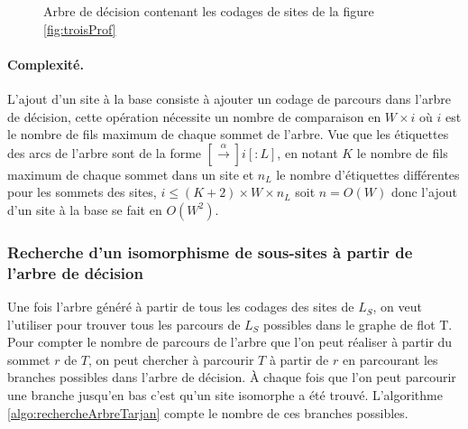 \begin{figure}[h]
\begin{center}
\end{center}
\caption{Arbre de décision contenant les codages de sites de la figure \ref{fig:troisProf}}
\label{fig:arbreDecTarjan}
\end{figure}

\paragraph{Complexité.}
L'ajout d'un site à la base consiste à ajouter un codage de parcours dans l'arbre de décision, cette opération nécessite un nombre de comparaison en $W\times i$ où $i$ est le nombre de fils maximum de chaque sommet de l'arbre. Vue que les étiquettes des arcs de l'arbre sont de la forme $[\xrightarrow{\alpha}]i[:L]$, en notant $K$ le nombre de fils maximum de chaque sommet dans un site et $n_L$ le nombre d'étiquettes différentes pour les sommets des sites, $i\leq (K+2)\times W\times n_L$ soit $n=O(W)$ donc l'ajout d'un site à la base se fait en $O(W^2)$.

\subsubsection{Recherche d'un isomorphisme de sous-sites à partir de l'arbre de décision}
Une fois l'arbre généré à partir de tous les codages des sites de $L_S$, on veut l'utiliser pour trouver tous les parcours de $L_S$ possibles dans le graphe de flot T. Pour compter le nombre de parcours de l'arbre que l'on peut réaliser à partir du sommet $r$ de $T$, on peut chercher à parcourir $T$ à partir de $r$ en parcourant les branches possibles dans l'arbre de décision. À chaque fois que l'on peut parcourir une branche jusqu'en bas c'est qu'un site isomorphe a été trouvé. L'algorithme \ref{algo:rechercheArbreTarjan} compte le nombre de ces branches possibles.

